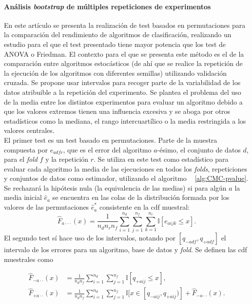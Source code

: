 	\paragraph{Análisis \textit{bootstrap} de múltiples 
repeticiones de experimentos} \cite{Otero201488} En este artículo 
se presenta la realización de test basados en permutaciones 
para la comparación del rendimiento de algoritmos de 
clasificación, realizando un estudio para el que el test 
presentado tiene mayor potencia que los test de ANOVA o 
Friedman. El contexto para el que se presenta este método es 
el de la comparación entre algoritmos estocásticos (de ahí 
que se realice la repetición de la ejecución de los 
algoritmos con diferentes semillas) utilizando validación 
cruzada. Se propone usar intervalos para recoger parte de la 
variabilidad de los datos atribuible a la repetición del 
experimento. Se plantea el problema del uso de la media entre 
los distintos experimentos para evaluar un algoritmo debido a 
que los valores extremos tienen una influencia excesiva y se 
aboga por otros estadísticos como la mediana, el rango 
intercuartílico o la media restringida a los valores 
centrales.\\
	El primer test es un test basado en permutaciones. Parte 
de la muestra compuesta por $e_{adfr}$, que es el error del 
algoritmo $a$-ésimo, el conjunto de datos $d$, para el 
\textit{fold} $f$ y la repetición $r$. Se utiliza en este 
test como estadístico para evaluar cada algoritmo la media de 
las ejecuciones en todos los \textit{folds}, repeticiones y 
conjuntos de datos como estimador, utilizando el algoritmo ~
\ref{alg:CMC-pvalue}. Se rechazará la hipótesis nula (la 
equivalencia de las medias) si para algún $a$ la media 
inicial $\hat{e}_a$ se encuentra en las colas de la 
distribución formada por los valores de las permutaciones $
\hat{e}_a^*$ consistente en la cdf muestral:
	\[ 
		\hat{F}_{a \cdot \cdot \cdot}(x) =
			\frac{1}{n_d n_r n_f}
			\sum\limits_{i=1}^{n_d}
				\sum\limits_{j=1}^{n_f}
					\sum\limits_{k=1}^{n_r}
						\mathbb{I}[ e_{aijk} \leq x ].
	\]
	El segundo test sí hace uso de los intervalos, notando 
por $[q_{-adf}, q_{+adf}]$ el intervalo de los errores para 
un algoritmo, base de datos y \textit{fold}. Se definen las 
cdf muestrales como
	
\begin{align*}
	\hat{F}_{-a \cdot \cdot}(x) &=
		\frac{1}{n_d n_f}
			\sum\limits_{i=1}^{n_d}
				\sum\limits_{j=1}^{n_f}
					\mathbb{I}[ q_{+aij} \leq x ], \\
	\hat{F}_{+a \cdot \cdot}(x) &=
		\frac{1}{n_d n_f}
			\sum\limits_{i=1}^{n_d}
				\sum\limits_{j=1}^{n_f}
					\mathbb{I}[ x \in [q_{-aij},q_{+aij}) ] +
			\hat{F}_{-a \cdot \cdot}(x) .			
\end{align*}

